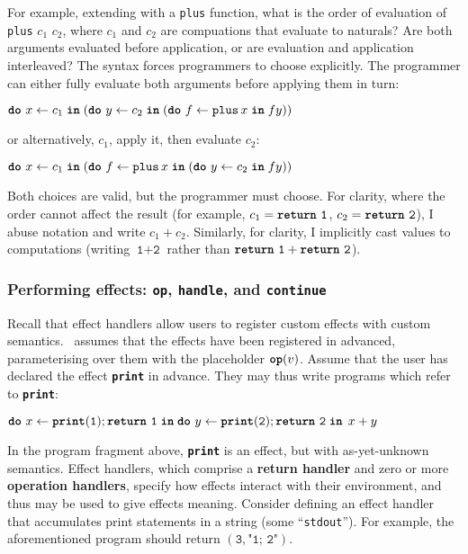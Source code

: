 For example, extending \efflang{} with a \texttt{plus} function, what is the order of evaluation of \texttt{plus} $c_1$ $c_2$, where $c_1$ and $c_2$ are compuations that evaluate to naturals? Are both arguments evaluated before application, or are evaluation and application interleaved? The syntax forces programmers to choose explicitly. The programmer can either fully evaluate both arguments before applying them in turn: 
\begin{eff}
$\texttt{\textbf{do}} \,\, {x} \leftarrow {c_1} \; \textbf{\texttt{in}} \; {(\texttt{\textbf{do}} \,\, {y} \leftarrow {c_2} \; \textbf{\texttt{in}} \; {(\texttt{\textbf{do}} \,\, {f} \leftarrow {\texttt{plus} \, x} \; \textbf{\texttt{in}} \; {f y})})}$
\end{eff}
or alternatively, $c_1$, apply it, then evaluate $c_2$:
\begin{eff}
$\texttt{\textbf{do}} \,\, {x} \leftarrow {c_1} \; \textbf{\texttt{in}} \; {(\texttt{\textbf{do}} \,\, {f} \leftarrow {\texttt{plus} \, x} \; \textbf{\texttt{in}} \; {(\texttt{\textbf{do}} \,\, {y} \leftarrow {c_2} \; \textbf{\texttt{in}} \; {f y})})}$
\end{eff}

Both choices are valid, but the programmer must choose. For clarity, where the order cannot affect the result (for example, $c_1 = \texttt{\textbf{return}} \,\, {\texttt{1}}$, $c_2 = \texttt{\textbf{return}} \,\, {\texttt{2}}$), I abuse notation and write $c_1+c_2$. Similarly, for clarity, I implicitly cast values to computations (writing $\texttt{1}+\texttt{2}$ rather than $\texttt{\textbf{return}} \,\, {\texttt{1}} + \texttt{\textbf{return}} \,\, {\texttt{2}}$).

\subsubsection{Performing effects: \texttt{op}, \texttt{handle}, and \texttt{continue}}
Recall that effect handlers allow users to register custom effects with custom semantics.\ \efflang{} assumes that the effects have been registered in advanced, parameterising over them with the placeholder $\textbf{\texttt{op}}({v})$. Assume that the user has declared the effect \texttt{\textbf{print}} in advance. They may thus write programs which refer to \texttt{\textbf{print}}:
\begin{eff}
$\texttt{\textbf{do}} \,\, {x} \leftarrow {\texttt{\textbf{print}}(\texttt{1});\texttt{\textbf{return}} \,\, {\texttt{1}}} \; \textbf{\texttt{in}} \; {{\texttt{\textbf{do}} \,\, {y} \leftarrow {\texttt{\textbf{print}}(\texttt{2});\texttt{\textbf{return}} \,\, {\texttt{2}}} \; \textbf{\texttt{in}} \; {\, x + y}}}$
\end{eff}

In the program fragment above, \textbf{\texttt{print}} is an effect, but with as-yet-unknown semantics. Effect handlers, which comprise a \textbf{return handler} and zero or more \textbf{operation handlers}, specify how effects interact with their environment, and thus may be used to give effects meaning. Consider defining an effect handler that accumulates print statements in a string (some ``\texttt{stdout}'').  For example, the aforementioned program should return $(\texttt{3}, \texttt{"1; 2"})$.


